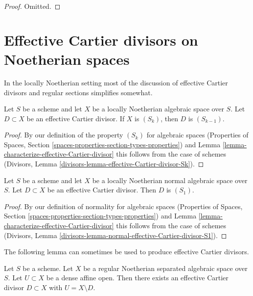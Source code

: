 \begin{proof}
Omitted.
\end{proof}





\section{Effective Cartier divisors on Noetherian spaces}
\label{section-Noetherian-effective-Cartier}

\noindent
In the locally Noetherian setting most of the discussion of
effective Cartier divisors and regular sections simplifies somewhat.

\begin{lemma}
\label{lemma-effective-Cartier-divisor-Sk}
Let $S$ be a scheme and let $X$ be a locally Noetherian algebraic space
over $S$. Let $D \subset X$ be an effective Cartier divisor. If $X$ is
$(S_k)$, then $D$ is $(S_{k - 1})$.
\end{lemma}

\begin{proof}
By our definition of the property $(S_k)$ for algebraic spaces
(Properties of Spaces, Section
\ref{spaces-properties-section-types-properties})
and
Lemma \ref{lemma-characterize-effective-Cartier-divisor}
this follows from the case of schemes
(Divisors, Lemma \ref{divisors-lemma-effective-Cartier-divisor-Sk}).
\end{proof}

\begin{lemma}
\label{lemma-normal-effective-Cartier-divisor-S1}
Let $S$ be a scheme and let $X$ be a locally Noetherian normal
algebraic space over $S$. Let $D \subset X$ be an
effective Cartier divisor. Then $D$ is $(S_1)$.
\end{lemma}

\begin{proof}
By our definition of normality for algebraic spaces
(Properties of Spaces, Section
\ref{spaces-properties-section-types-properties})
and
Lemma \ref{lemma-characterize-effective-Cartier-divisor}
this follows from the case of schemes
(Divisors, Lemma \ref{divisors-lemma-normal-effective-Cartier-divisor-S1}).
\end{proof}

\noindent
The following lemma can sometimes be used to produce effective
Cartier divisors.

\begin{lemma}
\label{lemma-complement-open-affine-effective-cartier-divisor}
Let $S$ be a scheme. Let $X$ be a regular Noetherian separated algebraic space
over $S$. Let $U \subset X$ be a dense affine open. Then there exists an
effective Cartier divisor $D \subset X$ with $U = X \setminus D$.
\end{lemma}

